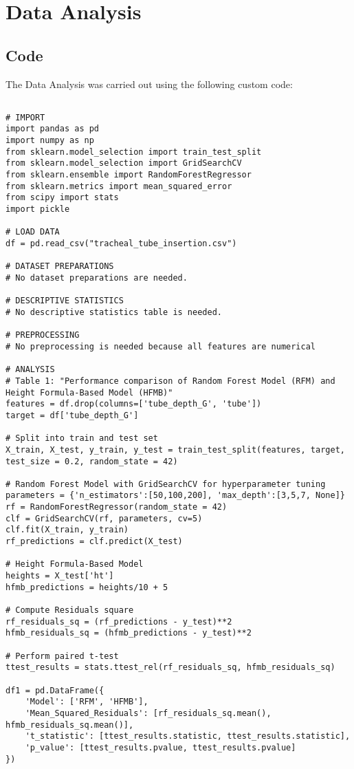 \documentclass[11pt]{article}
\begin{document}
\section{Data Analysis}
\subsection{{Code}}
The Data Analysis was carried out using the following custom code:

\begin{verbatim}

# IMPORT
import pandas as pd
import numpy as np
from sklearn.model_selection import train_test_split
from sklearn.model_selection import GridSearchCV
from sklearn.ensemble import RandomForestRegressor
from sklearn.metrics import mean_squared_error
from scipy import stats
import pickle

# LOAD DATA
df = pd.read_csv("tracheal_tube_insertion.csv")

# DATASET PREPARATIONS
# No dataset preparations are needed.

# DESCRIPTIVE STATISTICS
# No descriptive statistics table is needed.

# PREPROCESSING 
# No preprocessing is needed because all features are numerical 

# ANALYSIS
# Table 1: "Performance comparison of Random Forest Model (RFM) and Height Formula-Based Model (HFMB)"
features = df.drop(columns=['tube_depth_G', 'tube'])
target = df['tube_depth_G']

# Split into train and test set
X_train, X_test, y_train, y_test = train_test_split(features, target, test_size = 0.2, random_state = 42)

# Random Forest Model with GridSearchCV for hyperparameter tuning
parameters = {'n_estimators':[50,100,200], 'max_depth':[3,5,7, None]}
rf = RandomForestRegressor(random_state = 42)
clf = GridSearchCV(rf, parameters, cv=5)
clf.fit(X_train, y_train)
rf_predictions = clf.predict(X_test)

# Height Formula-Based Model
heights = X_test['ht']
hfmb_predictions = heights/10 + 5

# Compute Residuals square
rf_residuals_sq = (rf_predictions - y_test)**2
hfmb_residuals_sq = (hfmb_predictions - y_test)**2

# Perform paired t-test
ttest_results = stats.ttest_rel(rf_residuals_sq, hfmb_residuals_sq)

df1 = pd.DataFrame({
    'Model': ['RFM', 'HFMB'],
    'Mean_Squared_Residuals': [rf_residuals_sq.mean(), hfmb_residuals_sq.mean()],
    't_statistic': [ttest_results.statistic, ttest_results.statistic],
    'p_value': [ttest_results.pvalue, ttest_results.pvalue]
})


\end{verbatim}
\end{document}
